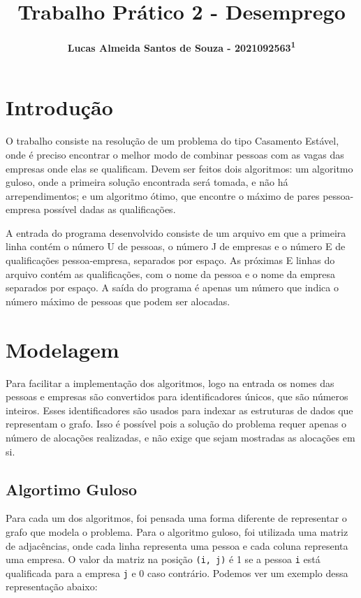 \documentclass[12pt]{article}
\title{\textbf{Trabalho Prático 2 - Desemprego}}
\author{\textbf{Lucas Almeida Santos de Souza - 2021092563\textsuperscript{1}}}
\date{\parbox{\linewidth}{\centering%
	\textsuperscript{1}Universidade Federal de Minas Gerais (UFMG)\endgraf
	Belo Horizonte - MG - Brasil\endgraf\bigskip
	\href{mailto:luscaxalmeidass@ufmg.br}{luscaxalmeidass@ufmg.br}}}
\begin{document}
\maketitle


\section{Introdução}

	\par O trabalho consiste na resolução de um problema do tipo Casamento Estável, onde é preciso encontrar o melhor modo de combinar pessoas com as vagas das empresas onde elas se qualificam. Devem ser feitos dois algoritmos: um algoritmo guloso, onde a primeira solução encontrada será tomada, e não há arrependimentos; e um algoritmo ótimo, que encontre o máximo de pares pessoa-empresa possível dadas as qualificações.

	\par A entrada do programa desenvolvido consiste de um arquivo em que a primeira linha contém o número U de pessoas, o número J de empresas e o número E de qualificações pessoa-empresa, separados por espaço. As próximas E linhas do arquivo contém as qualificações, com o nome da pessoa e o nome da empresa separados por espaço. A saída do programa é apenas um número que indica o número máximo de pessoas que podem ser alocadas.

\section{Modelagem}

	\par Para facilitar a implementação dos algoritmos, logo na entrada os nomes das pessoas e empresas são convertidos para identificadores únicos, que são números inteiros. Esses identificadores são usados para indexar as estruturas de dados que representam o grafo. Isso é possível pois a solução do problema requer apenas o número de alocações realizadas, e não exige que sejam mostradas as alocações em si.

	\subsection{Algortimo Guloso}
		\par Para cada um dos algoritmos, foi pensada uma forma diferente de representar o grafo que modela o problema. Para o algoritmo guloso, foi utilizada uma matriz de adjacências, onde cada linha representa uma pessoa e cada coluna representa uma empresa. O valor da matriz na posição \texttt{(i, j)} é 1 se a pessoa \texttt{i} está qualificada para a empresa \texttt{j} e 0 caso contrário. Podemos ver um exemplo dessa representação abaixo:
\end{document}
